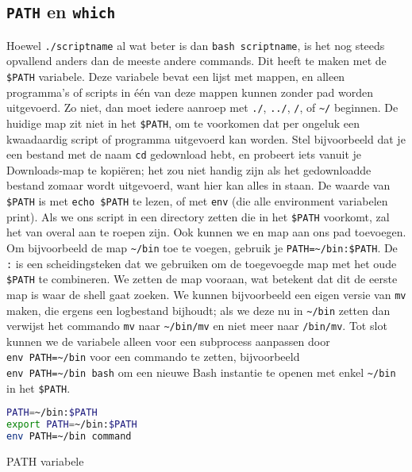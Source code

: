 \subsection{\texorpdfstring{\texttt{PATH} en \texttt{which}}{PATH en which}}\label{path-en-which}

Hoewel \texttt{./scriptname} al wat beter is dan \texttt{bash\ scriptname}, is het nog steeds opvallend anders dan de meeste andere commands. Dit heeft te maken met de \texttt{\$PATH} variabele. Deze variabele bevat een lijst met mappen, en alleen programma's of scripts in één van deze mappen kunnen zonder pad worden uitgevoerd. Zo niet, dan moet iedere aanroep met \texttt{./}, \texttt{../}, \texttt{/}, of \texttt{\textasciitilde/} beginnen. De huidige map zit niet in het \texttt{\$PATH}, om te voorkomen dat per ongeluk een kwaadaardig script of programma uitgevoerd kan worden. Stel bijvoorbeeld dat je een bestand met de naam \texttt{cd} gedownload hebt, en probeert iets vanuit je Downloads-map te kopiëren; het zou niet handig zijn als het gedownloadde bestand zomaar wordt uitgevoerd, want hier kan alles in staan. De waarde van \texttt{\$PATH} is met \texttt{echo\ \$PATH} te lezen, of met \texttt{env} (die alle environment variabelen print). Als we ons script in een directory zetten die in het \texttt{\$PATH} voorkomt, zal het van overal aan te roepen zijn. Ook kunnen we en map aan ons pad toevoegen. Om bijvoorbeeld de map \texttt{\textasciitilde/bin} toe te voegen, gebruik je \texttt{PATH=\textasciitilde/bin:\$PATH}. De \texttt{:} is een scheidingsteken dat we gebruiken om de toegevoegde map met het oude \texttt{\$PATH} te combineren. We zetten de map vooraan, wat betekent dat dit de eerste map is waar de shell gaat zoeken. We kunnen bijvoorbeeld een eigen versie van \texttt{mv} maken, die ergens een logbestand bijhoudt; als we deze nu in \texttt{\textasciitilde/bin} zetten dan verwijst het commando \texttt{mv} naar \texttt{\textasciitilde/bin/mv} en niet meer naar \texttt{/bin/mv}. Tot slot kunnen we de variabele alleen voor een subprocess aanpassen door \texttt{env\ PATH=\textasciitilde/bin} voor een commando te zetten, bijvoorbeeld \texttt{env\ PATH=\textasciitilde/bin\ bash} om een nieuwe Bash instantie te openen met enkel \texttt{\textasciitilde/bin} in het \texttt{\$PATH}.

\begin{listing}
\begin{lstlisting}[language=bash]
PATH=~/bin:$PATH
export PATH=~/bin:$PATH
env PATH=~/bin command
\end{lstlisting}
  \caption{PATH variabele}
\end{listing}

